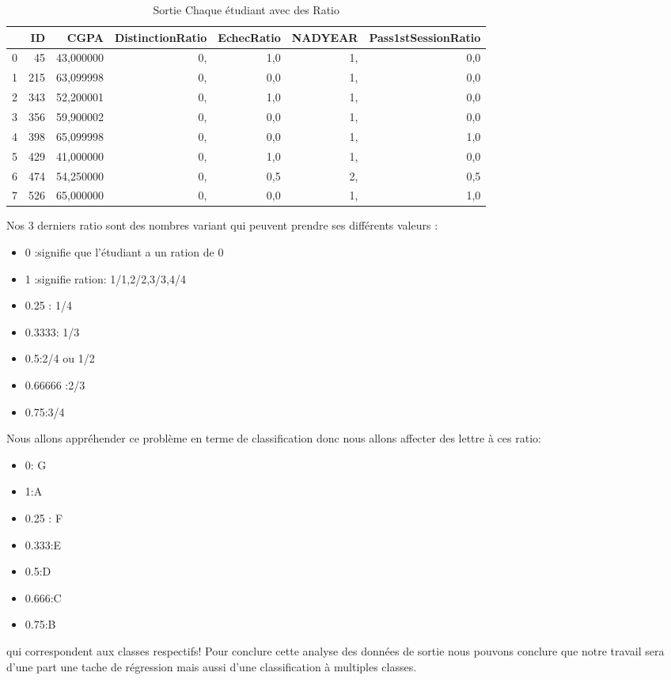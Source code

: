 \begin{table}
	\centering
	\begingroup %
	\captionsetup{type=table} %
	\caption{Sortie Chaque étudiant avec des Ratio}
	\label{tab:Output2}
	\begin{tabular}{lrrrrrr}
		\toprule
		{} &   ID &       CGPA &  DistinctionRatio &  EchecRatio &  NADYEAR &  Pass1stSessionRatio \\
		\midrule
		0 &   45 &  43,000000 &                0, &         1,0 &         1, &                  0,0 \\
		1 &  215 &  63,099998 &                0, &         0,0 &         1, &                  0,0 \\
		2 &  343 &  52,200001 &                0, &         1,0 &         1, &                  0,0 \\
		3 &  356 &  59,900002 &                0, &         0,0 &         1, &                  0,0 \\
		4 &  398 &  65,099998 &                0, &         0,0 &         1, &                  1,0 \\
		5 &  429 &  41,000000 &                0, &         1,0 &         1, &                  0,0 \\
		6 &  474 &  54,250000 &                0, &         0,5 &         2, &                  0,5 \\
		7 &  526 &  65,000000 &                0, &         0,0 &         1, &                  1,0 \\
		\bottomrule
	\end{tabular}
	\endgroup
\end{table}
Nos 3 derniers ratio sont des nombres variant qui peuvent prendre ses
différents valeurs :
\begin{itemize}
	\item 0 :signifie que l'étudiant a un ration de 0 
	\item  1 :signifie ration: 1/1,2/2,3/3,4/4
	\item  0.25 : 1/4
	\item  0.3333: 1/3
	\item  0.5:2/4 ou 1/2
	\item 0.66666 :2/3
	\item 0.75:3/4
\end{itemize}
 Nous allons appréhender ce problème en
terme de classification donc nous allons affecter des lettre à ces
ratio: 
\begin{itemize}
	\item 0: G
	\item  1:A
	\item  0.25 : F
	\item  0.333:E
	\item  0.5:D 
	\item 0.666:C
	\item 0.75:B
\end{itemize}
qui
correspondent aux classes respectifs!
Pour conclure cette analyse des données de sortie nous pouvons conclure que notre travail sera d'une part une tache de régression mais aussi d'une classification à multiples classes.
